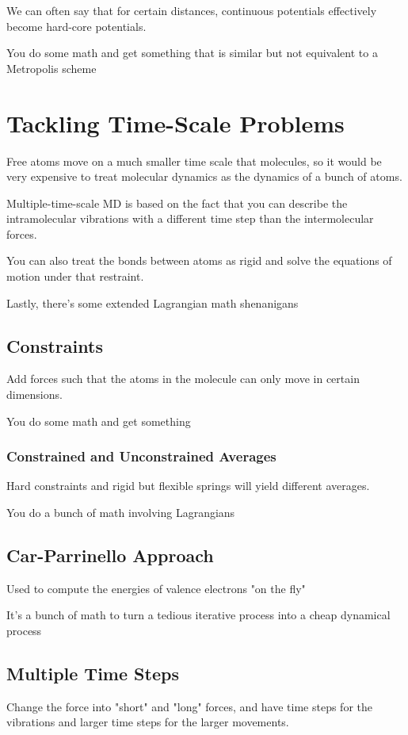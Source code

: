 \documentclass[fleqn]{report}
\begin{document}
We can often say that for certain distances, continuous potentials effectively 
become hard-core potentials. 

You do some math and get something that is similar but not equivalent to 
a Metropolis scheme 

\chapter{Tackling Time-Scale Problems}
Free atoms move on a much smaller time scale that molecules, so it would 
be very expensive to treat molecular dynamics as the dynamics of a bunch 
of atoms. 

Multiple-time-scale MD is based on the fact that you can describe the 
intramolecular vibrations with a different time step than the 
intermolecular forces.

You can also treat the bonds between atoms as rigid and solve the equations 
of motion under that restraint. 

Lastly, there's some extended Lagrangian math shenanigans 

\section{Constraints}
Add forces such that the atoms in the molecule can only move in 
certain dimensions. 

You do some math and get something 

\subsection{Constrained and Unconstrained Averages}
Hard constraints and rigid but flexible springs will yield different 
averages. 

You do a bunch of math involving Lagrangians 

\section{Car-Parrinello Approach}
Used to compute the energies of valence electrons "on the fly"

It's a bunch of math to turn a tedious iterative process into a cheap 
dynamical process 

\section{Multiple Time Steps}
Change the force into "short" and "long" forces, and have time steps 
for the vibrations and larger time steps for the larger movements. 
\end{document}
